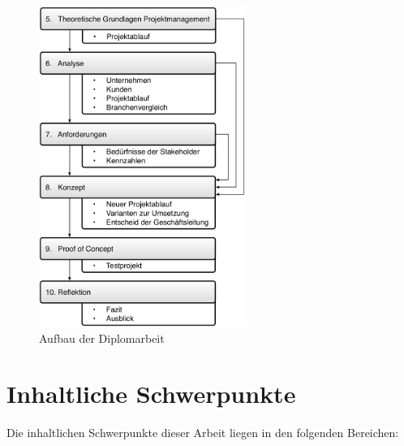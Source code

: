 \begin{figure}[htbp]
\begin{center}
\includegraphics[width=0.6\textwidth,angle=0]{./bilder/einleitung/01_gliederung_arbeit.pdf}
\caption[]{Aufbau der Diplomarbeit\footnotemark}
\label{pic:01_gliederung_arbeit}
\end{center}
\end{figure}


\section{Inhaltliche Schwerpunkte}
Die inhaltlichen Schwerpunkte dieser Arbeit liegen in den folgenden Bereichen:

